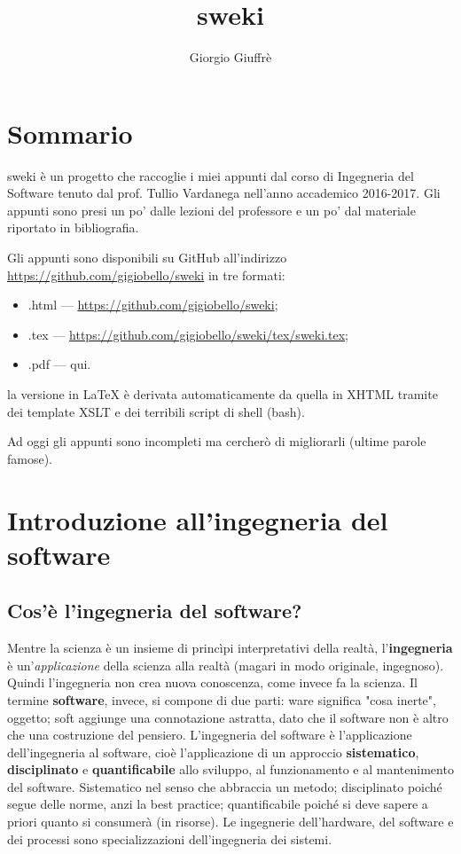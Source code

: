 \documentclass[a4paper]{article}
\title{sweki}
\author{Giorgio Giuffrè}
\date{}
\begin{document}
\maketitle
\tableofcontents
\newpage


\section{Sommario}
sweki è un progetto che raccoglie i miei appunti dal corso di Ingegneria del Software tenuto dal prof. Tullio Vardanega nell'anno accademico 2016-2017. Gli appunti sono presi un po' dalle lezioni del professore e un po' dal materiale riportato in bibliografia.

Gli appunti sono disponibili su GitHub all'indirizzo \url{https://github.com/gigiobello/sweki} in tre formati:
\begin{itemize}
	\item .html --- \url{https://github.com/gigiobello/sweki};
	\item .tex --- \url{https://github.com/gigiobello/sweki/tex/sweki.tex};
	\item .pdf --- qui.
\end{itemize}

la versione in \LaTeX{} è derivata automaticamente da quella in XHTML tramite dei template XSLT e dei terribili script di shell (bash).

Ad oggi gli appunti sono incompleti ma cercherò di migliorarli (ultime parole famose).



		
	\section{Introduzione all'ingegneria del software}


		
	\subsection{Cos'è l'ingegneria del software?}

		
Mentre la scienza è un insieme di princìpi interpretativi della realtà, l'\textbf{ingegneria} è un'\emph{applicazione} della scienza alla realtà (magari in modo originale, ingegnoso). Quindi l'ingegneria non crea nuova conoscenza, come invece fa la scienza. Il termine \textbf{software}, invece, si compone di due parti: ware significa "cosa inerte", oggetto; soft aggiunge una connotazione astratta, dato che il software non è altro che una costruzione del pensiero. L'ingegneria del software è l'applicazione dell'ingegneria al software, cioè l'applicazione di un approccio \textbf{sistematico}, \textbf{disciplinato} e \textbf{quantificabile} allo sviluppo, al funzionamento e al mantenimento del software. Sistematico nel senso che abbraccia un metodo; disciplinato poiché segue delle norme, anzi la best practice; quantificabile poiché si deve sapere a priori quanto si consumerà (in risorse). Le ingegnerie dell'hardware, del software e dei processi sono specializzazioni dell'ingegneria dei sistemi.
\end{document}

